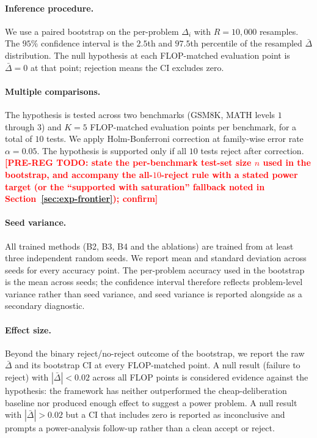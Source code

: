 \paragraph{Inference procedure.}
We use a paired bootstrap on the per-problem $\Delta_i$ with $R =
10{,}000$ resamples. The $95\%$ confidence interval is the
$2.5$th and $97.5$th percentile of the resampled $\bar{\Delta}$
distribution. The null hypothesis at each FLOP-matched evaluation
point is $\bar{\Delta} = 0$ at that point; rejection means the CI
excludes zero.

\paragraph{Multiple comparisons.}
The hypothesis is tested across two benchmarks (GSM8K, MATH levels
$1$ through $3$) and $K = 5$ FLOP-matched evaluation points per
benchmark, for a total of $10$ tests. We apply Holm-Bonferroni
correction at family-wise error rate $\alpha = 0.05$. The hypothesis
is supported only if all $10$ tests reject after correction.
\textcolor{red}{\textbf{[PRE-REG TODO: state the per-benchmark test-set
size $n$ used in the bootstrap, and accompany the all-$10$-reject rule
with a stated power target (or the ``supported with saturation''
fallback noted in Section~\ref{sec:exp-frontier}); confirm]}}

\paragraph{Seed variance.}
All trained methods (B2, B3, B4 and the ablations) are trained from
at least three independent random seeds. We report mean and standard
deviation across seeds for every accuracy point. The per-problem
accuracy used in the bootstrap is the mean across seeds; the
confidence interval therefore reflects problem-level variance rather
than seed variance, and seed variance is reported alongside as a
secondary diagnostic.

\paragraph{Effect size.}
Beyond the binary reject/no-reject outcome of the bootstrap, we report
the raw $\bar{\Delta}$ and its bootstrap CI at every FLOP-matched
point. A null result (failure to reject) with $|\bar{\Delta}| < 0.02$
across all FLOP points is considered evidence against the hypothesis:
the framework has neither outperformed the cheap-deliberation baseline
nor produced enough effect to suggest a power problem. A null result
with $|\bar{\Delta}| > 0.02$ but a CI that includes zero is reported
as inconclusive and prompts a power-analysis follow-up rather than a
clean accept or reject.

